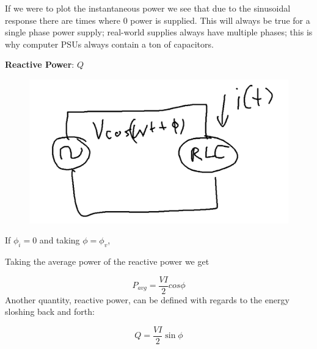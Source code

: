\documentclass[10pt]{article}
\begin{document}
If we were to plot the instantaneous power we see that due to the sinusoidal response there are times where $ 0 $ power is supplied.
This will always be true for a single phase power supply; real-world supplies always have multiple phases; this is why computer PSUs always contain a ton of capacitors.


\begin{definition}
	\textbf{Reactive Power}: $ Q $ 


	\begin{figure}[H]
		\centering
		\includegraphics[width=0.8\linewidth]{img/image_2022-09-12-11-49-46.png}
	\end{figure}


	If $ \phi_i = 0$ and taking $ \phi = \phi_v $,


	Taking the average power of the reactive power we get 

	\begin{equation}
		P_{avg} = \frac{VI}{2} cos\phi
	\end{equation}
	Another quantity, reactive power, can be defined with regards to the energy sloshing back and forth:

	\begin{equation}
		Q = \frac{VI}{2} \sin \phi
		\label{eq:349:reactive_power_q}
	\end{equation}
	

\end{definition}
\end{document}
